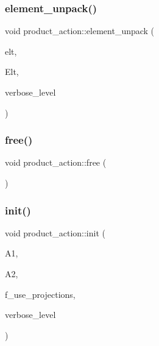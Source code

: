\subsubsection{\texorpdfstring{element\+\_\+unpack()}{element\_unpack()}}
{\footnotesize\ttfamily void product\+\_\+action\+::element\+\_\+unpack (\begin{DoxyParamCaption}\item[{\mbox{\hyperlink{galois_8h_a122c4acf389c050379f00341fdcd5812}{U\+B\+Y\+TE}} $\ast$}]{elt,  }\item[{\mbox{\hyperlink{galois_8h_a09fddde158a3a20bd2dcadb609de11dc}{I\+NT}} $\ast$}]{Elt,  }\item[{\mbox{\hyperlink{galois_8h_a09fddde158a3a20bd2dcadb609de11dc}{I\+NT}}}]{verbose\+\_\+level }\end{DoxyParamCaption})}

\mbox{\label{classproduct__action_afa357e78243f8b567d117f6e37ab037e}} 
\subsubsection{\texorpdfstring{free()}{free()}}
{\footnotesize\ttfamily void product\+\_\+action\+::free (\begin{DoxyParamCaption}{ }\end{DoxyParamCaption})}

\mbox{\label{classproduct__action_a3a84ca69f8b7e903eac0dd787cfa1cf9}} 
\subsubsection{\texorpdfstring{init()}{init()}}
{\footnotesize\ttfamily void product\+\_\+action\+::init (\begin{DoxyParamCaption}\item[{\mbox{\hyperlink{classaction}{action}} $\ast$}]{A1,  }\item[{\mbox{\hyperlink{classaction}{action}} $\ast$}]{A2,  }\item[{\mbox{\hyperlink{galois_8h_a09fddde158a3a20bd2dcadb609de11dc}{I\+NT}}}]{f\+\_\+use\+\_\+projections,  }\item[{\mbox{\hyperlink{galois_8h_a09fddde158a3a20bd2dcadb609de11dc}{I\+NT}}}]{verbose\+\_\+level }\end{DoxyParamCaption})}


